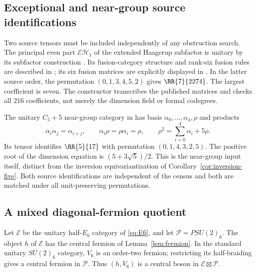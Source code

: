 \subsection{Exceptional and near-group source identifications}\label{sec:source-audit}
Two source tensors must be included independently of any obstruction search.
The principal even part $\mathcal{EH}_1$ of the extended Haagerup subfactor
is unitary by its subfactor construction \cite{BMPS}. Its fusion-category
structure and rank-six fusion rules are described in
\cite[Section~2.1]{GMPPS}; its six fusion matrices are explicitly displayed
in \cite[Section~5.1]{BPEH}. In the latter source order,
the permutation $(0,1,3,4,5,2)$ gives $\RR{7}{2274}$. The largest coefficient
is seven. The constructor transcribes the published matrices and checks
all $216$ coefficients, not merely the dimension field or formal codegrees.

The unitary $C_5+5$ near-group category in \cite[Example~13.8]{Izumi} has
basis $\alpha_0,\ldots,\alpha_4,\rho$ and products
\[
 \alpha_i\alpha_j=\alpha_{i+j},\qquad
 \alpha_i\rho=\rho\alpha_i=\rho,\qquad
 \rho^2=\sum_{i=0}^4\alpha_i+5\rho.
\]
Its tensor identifies $\RR{5}{17}$ with permutation $(0,1,4,3,2,5)$.
The positive root of the dimension equation is $(5+3\sqrt5)/2$.
This is the near-group input itself, distinct from the inversion
equivariantization of Corollary~\ref{cor:inversion-five}. Both source
identifications are independent of the census and both are matched under
all unit-preserving permutations.

\subsection{A mixed diagonal-fermion quotient}\label{sec:mixed-fermion}
Let $\mathcal E$ be the unitary half-$E_6$ category of \eqref{eq:E6}, and
let $\mathcal P=PSU(2)_6$. The object $h$ of $\mathcal E$ has the central
fermion of Lemma~\ref{lem:fermion}. In the standard unitary $SU(2)_6$
category, $V_6$ is an order-two fermion; restricting its half-braiding gives
a central fermion in $\mathcal P$. Thus $(h,V_6)$ is a central boson in
$\mathcal E\boxtimes\mathcal P$.


